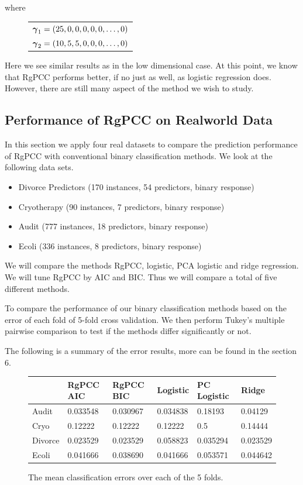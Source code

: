 \documentclass[main.tex]{subfiles}
\begin{document}
where

\begin{figure}[H]
	\begin{tabular}{l}
		$\boldsymbol \gamma_1 = (25, 0, 0, 0, 0, 0, \ldots , 0)$ \\
		$\boldsymbol \gamma_2 = (10, 5, 5, 0, 0, 0, \ldots , 0)$
	\end{tabular}
\end{figure}

Here we see similar results as in the low dimensional case. At this point, we know that RgPCC performs better, if no just as well, as logistic regression does. However, there are still many aspect of the method we wish to study.

\subsection{Performance of RgPCC on Realworld Data}

In this section we apply four real datasets to compare the prediction performance of RgPCC with conventional binary classification methods. We look at the following data sets.
\begin{itemize}
    \item Divorce Predictors (170 instances, 54 predictors, binary response)
    \item Cryotherapy (90 instances, 7 predictors, binary response)
    \item Audit (777 instances, 18 predictors, binary response)
    \item Ecoli (336 instances, 8 predictors, binary response)
\end{itemize}

We will compare the methods RgPCC, logistic, PCA logistic and ridge regression. We will tune RgPCC by AIC and BIC. Thus we will compare a total of five different methods. 

To compare the performance of our binary classification methods based on the error of each fold of 5-fold cross validation. We then perform Tukey's multiple pairwise comparison to test if the methods differ significantly or not.

The following is a summary of the error results, more can be found in the section 6.

\begin{figure}[H]
	\begin{tabular}{l l l l l l} \hline
    & RgPCC AIC & RgPCC BIC & Logistic & PC Logistic & Ridge \\ \hline
    \rowcolor{LightCyan}
    Audit & 0.033548 & 0.030967 & 0.034838    & 0.18193 & 0.04129\\
    Cryo & 0.12222 & 0.12222 & 0.12222         &  0.5 & 0.14444 \\
    \rowcolor{LightCyan}
    Divorce & 0.023529 & 0.023529 & 0.058823 & 0.035294 & 0.023529\\
    Ecoli & 0.041666 & 0.038690 & 0.041666  & 0.053571 & 0.044642\\ \hline
	\end{tabular}
	\caption{The mean classification errors over each of the 5 folds.}
\end{figure}
\end{document}
